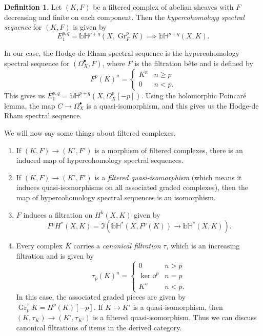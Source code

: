 \documentclass[leqno, openany]{memoir}
\theoremstyle{definition}
\newtheorem{defn}[thm]{Definition}
\theoremstyle{remark}
\theoremstyle{plain}
\theoremstyle{definition}
\theoremstyle{remark}
\newcommand{\bH}{\mathbb{bH}}
\newcommand{\on}[1]{\operatorname{#1}}
\begin{document}
\begin{defn}
    Let $(K, F)$ be a filtered complex of abelian sheaves with $F$ decreasing and finite on each component. Then the \textit{hypercohomology spectral sequence} for $(K, F)$ is given by
    \[ E_1^{p,q} = \bH^{p+q}(X, \on{Gr}_F^p K) \implies \bH^{p+q}(X, K). \]
\end{defn}

In our case, the Hodge-de Rham spectral sequence is the hypercohomology spectral sequence for $(\Omega_X^{\bullet}, F)$, where $F$ is the filtration b\^ete and is defined by
\[ F^p(K)^n = \begin{cases}
    K^n & n \geq p \\
    0 & n < p.
\end{cases}
\]
This gives us $E_1^{p,q} = \bH^{p+q}(X, \Omega_X^p [-p])$. Using the holomorphic Poincar\'e lemma, the map $C \to \Omega_X^{\bullet}$ is a quasi-isomorphism, and this gives us the Hodge-de Rham spectral sequence.

We will now say some things about filtered complexes.
\begin{enumerate}
    \item If $(K, F) \to (K', F')$ is a morphism of filtered complexes, there is an induced map of hypercohomology spectral sequences.
    \item If $(K, F) \to (K', F')$ is a \textit{filtered quasi-isomorphism} (which means it induces quasi-isomorphisms on all associated graded complexes), then the map of hypercohomology spectral sequences is an isomorphism.
    \item $F$ induces a filtration on $H^k(X, K)$ given by
        \[ F^p H^*(X, K) = \Im(\bH^*(X, F^p(K)) \to \bH^*(X, K)). \]
    \item Every complex $K$ carries a \textit{canonical filtration} $\tau$, which is an increasing filtration and is given by
        \[ \tau_p(K)^n = \begin{cases}
            0 & n > p \\
            \ker \dd^p & n = p \\
            K^n & n < p.
        \end{cases}
        \]
        In this case, the associated graded pieces are given by $\on{Gr}_p^{\tau} K = H^p(K)[-p]$. If $K \to K'$ is a quasi-isomorphism, then $(K, \tau_K) \to (K', \tau_{K'})$ is a filtered quasi-isomorphism. Thus we can discuss canonical filtrations of items in the derived category.
\end{enumerate}
\end{document}
